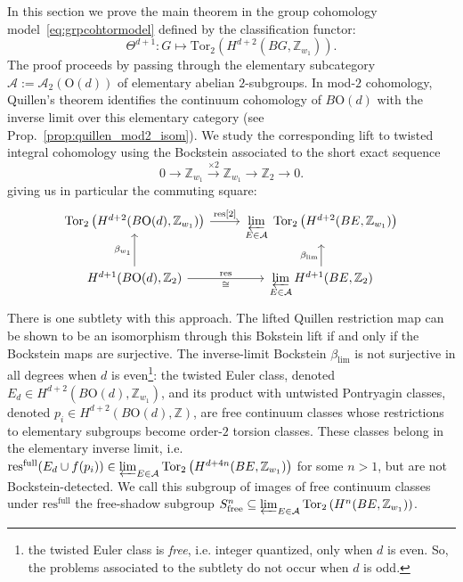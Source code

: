 \documentclass[aps,prx,reprint,superscriptaddress,twocolumn,amsmath,amssymb,amsfonts, nofootinbib]{revtex4-2}
\newcommand{\res}{\text{res}}
\newcommand{\tor}{\text{Tor}}
\newcommand{\Z}{\mathbb{Z}}
\theoremstyle{apsstyle}
\begin{document}
In this section we prove the main theorem in the group cohomology model~\eqref{eq:grpcohtormodel} defined by the classification functor:
\begin{equation*}
    \Theta^{d+1}: G \mapsto \tor_2 \left(H^{d+2}(BG, \Z_{w_{1}})\right).
\end{equation*}
The proof proceeds by passing through the elementary subcategory $\mathcal{A}:=\mathcal A_2(\mathrm{O}(d))$ of elementary abelian $2$-subgroups. In mod-$2$ cohomology, Quillen’s theorem identifies the continuum cohomology of $B\mathrm{O}(d)$ with the inverse limit over this elementary category (see Prop.~\ref{prop:quillen_mod2_isom}). We study the corresponding lift to twisted integral cohomology using the Bockstein associated to the short exact sequence 
\begin{equation*}
0\to \mathbb Z_{w_1}\xrightarrow{\times 2}\mathbb Z_{w_1}\to\mathbb Z_2\to 0.
\end{equation*}
giving us in particular the commuting square:
\begin{equation*}
    \begin{tikzcd}
        \tor_{2}\left(H^{d+2}(B\mathrm{O}(d), \Z_{w_{1}})\right) \arrow[r, "\res\text{[}2\text{]}"] & \varprojlim\limits_{E\in \mathcal{A}} \;  \tor_{2} \left(H^{d+2}(BE,\Z_{w_1})\right)\\
        H^{d+1}(B\mathrm{O}(d), \Z_{2}) \arrow[r, "\res", "\cong"'] \arrow[u, "\beta_{w_{1}}"] &\varprojlim\limits_{E\in \mathcal{A}} H^{d+1}(BE, \Z_{2}) \arrow[u, "\beta_{\lim}"]
    \end{tikzcd}
\end{equation*}
There is one subtlety with this approach. The lifted Quillen restriction map can be shown to be an isomorphism through this Bokstein lift if and only if the Bockstein maps are surjective. The inverse-limit Bockstein $\beta_{\lim}$ is not surjective in all degrees when $d$ is even\footnote{the twisted Euler class is \textit{free}, i.e. integer quantized, only when $d$ is even. So, the problems associated to the subtlety do not occur when $d$ is odd.}: the twisted Euler class, denoted $E_{d}\in H^{d+2}(B\mathrm{O}(d), \Z_{w_{1}})$, and its product with untwisted Pontryagin classes, denoted $p_{i}\in H^{d+2}(B\mathrm{O}(d), \Z)$, are free continuum classes whose restrictions to elementary subgroups become order-$2$ torsion classes. These classes belong in the elementary inverse limit, i.e. $\res^{\mathrm{full}}(E_{d}\cup f(p_i))\in \varprojlim_{E\in \mathcal{A}}  \tor_{2} \left(H^{d+4n}(BE,\Z_{w_1})\right)$ for some $n>1$, but are not Bockstein-detected. We call this subgroup of images of free continuum classes under $\res^{\mathrm{full}}$ the free-shadow subgroup $S_{\mathrm{free}}^{n}\subseteq \varprojlim_{E\in \mathcal{A}}  \tor_{2} \left(H^{n}(BE,\Z_{w_1})\right)$.
\end{document}
